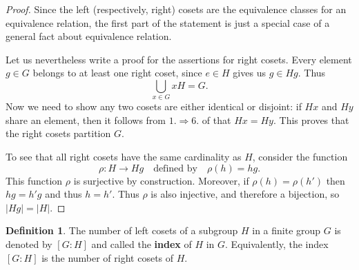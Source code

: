 \documentclass[12pt]{report}
\numberwithin{equation}{section}
\numberwithin{theorem}{chapter}
\theoremstyle{definition}
\newtheorem{definition}[theorem]{Definition}
\newtheorem{example}[theorem]{Example}
\newtheorem*{basic properties}{Basic Properties}
\newtheorem*{Important Remark}{Important Remark}
\newcommand{\df}[1]{{\bf #1}\index{#1}}
\begin{document}
\begin{proof}
Since the left (respectively, right) cosets are the equivalence classes for an equivalence relation, the first part of the statement is just a special case of a general fact about equivalence relation.

Let us nevertheless write a proof for the assertions for right cosets.
Every element $g \in G$ belongs to at least one right coset, since $e \in H$ gives us $g \in Hg$. Thus
$$\bigcup_{x\in G} xH=G.$$
Now we need to show any two cosets are either identical or disjoint: if $Hx$ and $Hy$ share an element, then it follows from $1.\Rightarrow 6.$ of  that $Hx=Hy$. This proves that the right cosets partition $G$. 


To see that all right cosets have the same cardinality as $H$, consider the function
$$\rho\!: H \to Hg \quad \textrm{defined by} \quad \rho(h) = hg.$$ 
This function $\rho$ is surjective by construction. Moreover, if $\rho(h) = \rho(h')$ then $hg = h'g$ and thus $h = h'$. Thus $\rho$ is also injective, and therefore a bijection, so $|Hg| = |H|$.
\end{proof}

%
%
%
%



\begin{definition}\label{definition of index}\index{$[G : H]$}
The number of left cosets of a subgroup $H$ in a finite group $G$ is denoted by $[G:H]$ and called the \df{index} of $H$ in $G$. Equivalently, the index $[G : H]$ is the number of right cosets of $H$.
\end{definition}
\end{document}

